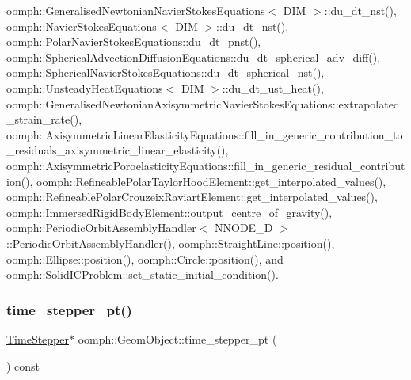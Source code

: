 oomph\+::\+Generalised\+Newtonian\+Navier\+Stokes\+Equations$<$ D\+I\+M $>$\+::du\+\_\+dt\+\_\+nst(), oomph\+::\+Navier\+Stokes\+Equations$<$ D\+I\+M $>$\+::du\+\_\+dt\+\_\+nst(), oomph\+::\+Polar\+Navier\+Stokes\+Equations\+::du\+\_\+dt\+\_\+pnst(), oomph\+::\+Spherical\+Advection\+Diffusion\+Equations\+::du\+\_\+dt\+\_\+spherical\+\_\+adv\+\_\+diff(), oomph\+::\+Spherical\+Navier\+Stokes\+Equations\+::du\+\_\+dt\+\_\+spherical\+\_\+nst(), oomph\+::\+Unsteady\+Heat\+Equations$<$ D\+I\+M $>$\+::du\+\_\+dt\+\_\+ust\+\_\+heat(), oomph\+::\+Generalised\+Newtonian\+Axisymmetric\+Navier\+Stokes\+Equations\+::extrapolated\+\_\+strain\+\_\+rate(), oomph\+::\+Axisymmetric\+Linear\+Elasticity\+Equations\+::fill\+\_\+in\+\_\+generic\+\_\+contribution\+\_\+to\+\_\+residuals\+\_\+axisymmetric\+\_\+linear\+\_\+elasticity(), oomph\+::\+Axisymmetric\+Poroelasticity\+Equations\+::fill\+\_\+in\+\_\+generic\+\_\+residual\+\_\+contribution(), oomph\+::\+Refineable\+Polar\+Taylor\+Hood\+Element\+::get\+\_\+interpolated\+\_\+values(), oomph\+::\+Refineable\+Polar\+Crouzeix\+Raviart\+Element\+::get\+\_\+interpolated\+\_\+values(), oomph\+::\+Immersed\+Rigid\+Body\+Element\+::output\+\_\+centre\+\_\+of\+\_\+gravity(), oomph\+::\+Periodic\+Orbit\+Assembly\+Handler$<$ N\+N\+O\+D\+E\+\_\+D $>$\+::\+Periodic\+Orbit\+Assembly\+Handler(), oomph\+::\+Straight\+Line\+::position(), oomph\+::\+Ellipse\+::position(), oomph\+::\+Circle\+::position(), and oomph\+::\+Solid\+I\+C\+Problem\+::set\+\_\+static\+\_\+initial\+\_\+condition().

\mbox{\label{classoomph_1_1GeomObject_a02a503606d959d61acb8ca4b94dbc5e6}} 
\subsubsection{\texorpdfstring{time\+\_\+stepper\+\_\+pt()}{time\_stepper\_pt()}\hspace{0.1cm}{\footnotesize\ttfamily [2/2]}}
{\footnotesize\ttfamily \hyperlink{classoomph_1_1TimeStepper}{Time\+Stepper}$\ast$ oomph\+::\+Geom\+Object\+::time\+\_\+stepper\+\_\+pt (\begin{DoxyParamCaption}{ }\end{DoxyParamCaption}) const\hspace{0.3cm}{\ttfamily [inline]}}




